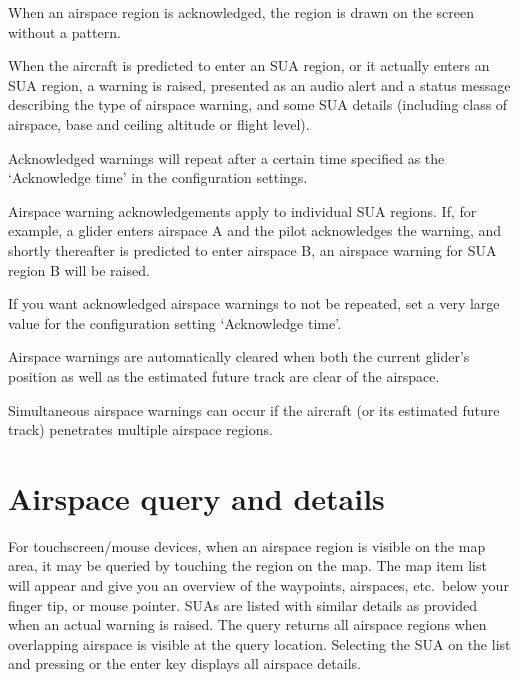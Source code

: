 When an airspace region is acknowledged, the region is drawn on the
screen without a pattern.

When the aircraft is predicted to enter an SUA region, or it actually
enters an SUA region, a warning is raised, presented as an audio alert
and a status message describing the type of airspace warning, and some SUA
details (including class of airspace, base and ceiling altitude or
flight level).

Acknowledged warnings will repeat after a certain time specified as
the `Acknowledge time' in the configuration settings.

Airspace warning acknowledgements apply to individual SUA regions.
If, for example, a glider enters airspace A and the pilot acknowledges
the warning, and shortly thereafter is predicted to enter airspace B,
an airspace warning for SUA region B will be raised.

\tip If you want acknowledged airspace warnings to not be repeated,
set a very large value for the configuration setting `Acknowledge
time'.

Airspace warnings are automatically cleared when both the current
glider's position as well as the estimated future track are clear
of the airspace.

Simultaneous airspace warnings can occur if the aircraft (or its
estimated future track) penetrates multiple airspace regions.


\section{Airspace query and details}

For touchscreen/mouse devices, when an airspace region is visible on
the map area, it may be queried by touching the region on the map.  
The map item list will appear and give you an overview of the waypoints, 
airspaces, etc.\ below your finger tip, or mouse pointer.  SUAs are listed with
similar details as provided when an actual warning is raised.  
The query returns all airspace regions when overlapping airspace is visible at 
the query location.
Selecting the SUA on the list and pressing  or the enter key 
displays all airspace details. 


